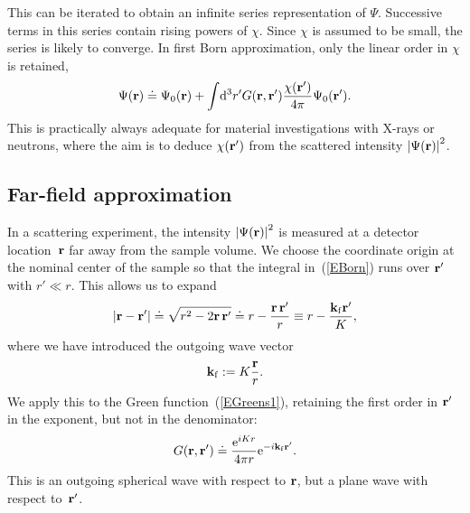 This can be iterated to obtain an infinite series representation of $\Psi$.
Successive terms in this series contain rising powers of $\chi$.
Since $\chi$ is assumed to be small, the series is likely to converge.
In first Born approximation,
only the linear order in $\chi$ is retained,
\begin{equation}\label{EBorn}
  \Psi(\mathbf{r})
  \doteq \Psi_0(\mathbf{r})
  + \int\!{\rm d}^3r' G(\mathbf{r},\mathbf{r}')\frac{\chi(\mathbf{r}')}{4\pi}
   \Psi_0(\mathbf{r}').
\end{equation}
This is practically always adequate for
material investigations with X-rays or neutrons,
where the aim is to 
deduce $\chi(\mathbf{r}')$ from the scattered intensity ${|\Psi(\mathbf{r})|}^2$.


\subsection{Far-field approximation}


In a scattering experiment,
the intensity ${|\Psi(\mathbf{r})|}^2$ is measured
at a detector location~$\mathbf{r}$
far away from the sample volume.
We choose the coordinate origin at the nominal center of the sample
so that the integral in~(\ref{EBorn}) runs over $\mathbf{r}'$ with $r'\ll r$.
This allows us to expand
\begin{equation}
  \left|\mathbf{r}-\mathbf{r}'\right|
  \doteq \sqrt{r^2-2\mathbf{r}\,\mathbf{r}'}
  \doteq r - \frac{\mathbf{r}\,\mathbf{r}'}{r}
  \equiv r - \frac{\mathbf{k}_{\rm f} \mathbf{r}'}{K},
\end{equation}
where we have introduced the outgoing wave vector
\begin{equation}
  \mathbf{k}_{\rm f}:=K\frac{\mathbf{r}}{r}.
\end{equation}
We apply this to the Green function~(\ref{EGreens1}),
retaining the first order in $\mathbf{r}'$ in the exponent,
but not in the denominator:
\begin{equation}\label{EGreenFar}
  G(\mathbf{r},\mathbf{r}')
  \doteq\frac{{\rm e}^{iKr}}{4\pi r}{\rm e}^{-i\mathbf{k}_{\rm f} \mathbf{r}'}.
\end{equation}
This is an outgoing spherical wave with respect to $\mathbf{r}$,
but a plane wave with respect to~$\mathbf{r}'$.

